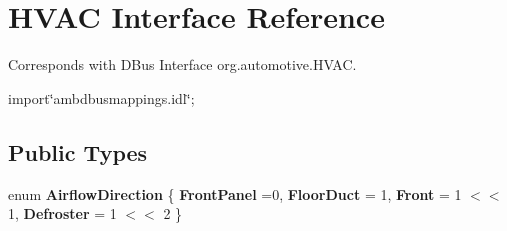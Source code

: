 \hypertarget{interfaceHVAC}{\section{H\+V\+A\+C Interface Reference}
\label{interfaceHVAC}
}


Corresponds with D\+Bus Interface org.\+automotive.\+H\+V\+A\+C.  




{\ttfamily import\char`\"{}ambdbusmappings.\+idl\char`\"{};}

\subsection*{Public Types}
\begin{DoxyCompactItemize}
\item 
\hypertarget{interfaceHVAC_afb87f124d56fe4e1f0c29f72ea4e981c}{enum {\bfseries Airflow\+Direction} \{ {\bfseries Front\+Panel} =0, 
{\bfseries Floor\+Duct} = 1, 
{\bfseries Front} = 1 $<$$<$ 1, 
{\bfseries Defroster} = 1 $<$$<$ 2
 \}}\label{interfaceHVAC_afb87f124d56fe4e1f0c29f72ea4e981c}

\end{DoxyCompactItemize}
